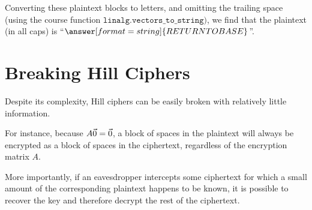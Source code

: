 \documentclass{ximera}
\begin{document}
\begin{example}
  Converting these plaintext blocks to letters, and omitting the trailing space (using the course function $\texttt{linalg.vectors\_to\_string})$,
  we find that the plaintext (in all caps) is ``$\answer[format=string]{RETURN TO BASE}$''.
\end{example}

\section*{Breaking Hill Ciphers}

Despite its complexity, Hill ciphers can be easily broken with relatively little information. 

For
instance, because $A\vec{0}=\vec{0}$, a block of spaces in the plaintext
will always be encrypted as a block of spaces in the ciphertext,
regardless of the encryption matrix $A$. 

More importantly, if an eavesdropper intercepts
some ciphertext for which a small amount of the corresponding
plaintext happens to be known, it is possible to recover
the key and therefore decrypt the rest of the ciphertext. 
\end{document}
